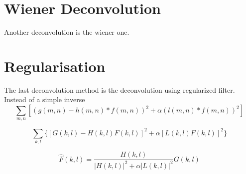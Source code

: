 \section{Wiener Deconvolution}
 Another deconvolution is the wiener one. 




\section{Regularisation}
The last deconvolution method is the deconvolution using regularized filter. 
Instead of a simple inverse 
\begin{equation}
\sum_{m,n} \left[ (g(m,n) - h(m,n)*f(m,n))^2 + \alpha (l(m,n)*f(m,n))^2 \right]
\end{equation}

\begin{equation}
\sum_{k,l} \{ [G(k,l) - H(k,l)F(k,l)]^2 + \alpha [L(k,l)F(k,l)]^2\}
\end{equation}


\begin{equation}
\hat{F}(k,l) = \frac{H(k,l)}{|H(k,l)|^2 + \alpha |L(k,l)|^2} G(k,l)
\end{equation}

